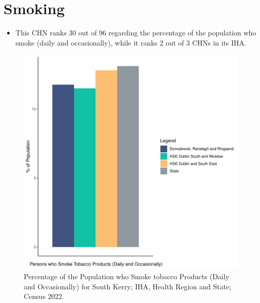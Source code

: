 \documentclass{article}
\begin{document}
\pagebreak

\section{Smoking}\label{sect:Smoking}
\begin{itemize}
\item This CHN ranks  30 out of 96 regarding the percentage of the population who smoke (daily and occasionally), while it ranks   2 out of 3 CHNs in its IHA.
\end{itemize}
\begin{figure}[H]
	\centering
	\includegraphics[width = 120mm]{../figures/SmokingED.pdf}
	\caption{Percentage of the Population who Smoke tobacco Products (Daily and Occasionally) for South Kerry; IHA, Health Region and State; Census 2022.}
	\label{fig:2ae19629-1a6a-13a3-e055-000000000001}
	\end{figure}
	
\end{document}
